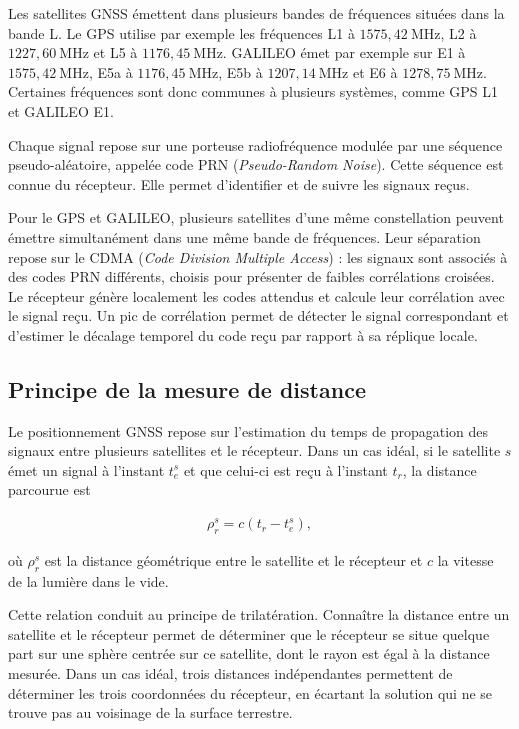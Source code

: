 Les satellites GNSS émettent dans plusieurs bandes de fréquences situées dans
la bande L. Le GPS utilise par exemple les fréquences L1 à
$1575{,}42~\mathrm{MHz}$, L2 à $1227{,}60~\mathrm{MHz}$ et L5 à
$1176{,}45~\mathrm{MHz}$. GALILEO émet par exemple sur E1 à
$1575{,}42~\mathrm{MHz}$, E5a à $1176{,}45~\mathrm{MHz}$, E5b à
$1207{,}14~\mathrm{MHz}$ et E6 à $1278{,}75~\mathrm{MHz}$. Certaines
fréquences sont donc communes à plusieurs systèmes, comme GPS L1 et GALILEO E1.

Chaque signal repose sur une porteuse radiofréquence modulée par une séquence pseudo-aléatoire,
appelée code PRN
(\textit{Pseudo-Random Noise}). Cette séquence est connue du récepteur. Elle
permet d'identifier et de suivre les signaux reçus.

Pour le GPS et GALILEO, plusieurs satellites d'une même constellation peuvent
émettre simultanément dans une même bande de fréquences. Leur séparation
repose sur le CDMA (\textit{Code Division Multiple Access}) :
les signaux sont associés à des codes PRN différents, choisis pour présenter
de faibles corrélations croisées. Le récepteur génère localement les codes
attendus et calcule leur corrélation avec le signal reçu. Un pic de
corrélation permet de détecter le signal correspondant et d'estimer le
décalage temporel du code reçu par rapport à sa réplique locale.


\subsection{Principe de la mesure de distance}

Le positionnement GNSS repose sur l'estimation du temps de propagation des
signaux entre plusieurs satellites et le récepteur. Dans un cas idéal, si le
satellite $s$ émet un signal à l'instant $t_e^s$ et que celui-ci est reçu à
l'instant $t_r$, la distance parcourue est

\begin{align}
\rho_r^s = c\left(t_r-t_e^s\right),
\label{new:geometric_time_range}
\end{align}

où $\rho_r^s$ est la distance géométrique entre le satellite et le récepteur et
$c$ la vitesse de la lumière dans le vide.

Cette relation conduit au principe de trilatération. Connaître la distance entre
un satellite et le récepteur permet de déterminer que le récepteur se situe quelque
part sur une sphère centrée sur ce satellite, dont le rayon est égal à la distance
mesurée. Dans un cas idéal,
trois distances indépendantes permettent de déterminer les trois coordonnées
du récepteur, en écartant la solution qui ne se trouve pas au voisinage de la
surface terrestre.

